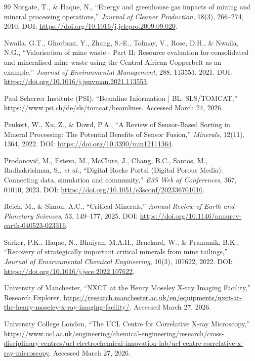 \documentclass[12pt,a4paper]{article}
\begin{document}
\begin{thebibliography}{99}
Norgate, T., \& Haque, N., ``Energy and greenhouse gas impacts of mining and mineral processing operations,'' \textit{Journal of Cleaner Production}, 18(3), 266--274, 2010. DOI: \url{https://doi.org/10.1016/j.jclepro.2009.09.020}.

Nwaila, G.T., Ghorbani, Y., Zhang, S.-E., Tolmay, V., Rose, D.H., \& Nwaila, N.G., ``Valorisation of mine waste - Part II: Resource evaluation for consolidated and mineralised mine waste using the Central African Copperbelt as an example,'' \textit{Journal of Environmental Management}, 288, 113553, 2021. DOI: \url{https://doi.org/10.1016/j.jenvman.2021.113553}.

Paul Scherrer Institute (PSI), ``Beamline Information | BL: SLS/TOMCAT,'' \url{https://www.psi.ch/de/sls/tomcat/beamlines}. Accessed March 24, 2026.

Peukert, W., Xu, Z., \& Dowd, P.A., ``A Review of Sensor-Based Sorting in Mineral Processing: The Potential Benefits of Sensor Fusion,'' \textit{Minerals}, 12(11), 1364, 2022. DOI: \url{https://doi.org/10.3390/min12111364}.

Prodanović, M., Esteva, M., McClure, J., Chang, B.C., Santos, M., Radhakrishnan, S., \textit{et al.}, ``Digital Rocks Portal (Digital Porous Media): Connecting data, simulation and community,'' \textit{E3S Web of Conferences}, 367, 01010, 2023. DOI: \url{https://doi.org/10.1051/e3sconf/202336701010}.

Reich, M., \& Simon, A.C., ``Critical Minerals,'' \textit{Annual Review of Earth and Planetary Sciences}, 53, 149--177, 2025. DOI: \url{https://doi.org/10.1146/annurev-earth-040523-023316}.

Sarker, P.K., Haque, N., Bhuiyan, M.A.H., Bruckard, W., \& Pramanik, B.K., ``Recovery of strategically important critical minerals from mine tailings,'' \textit{Journal of Environmental Chemical Engineering}, 10(3), 107622, 2022. DOI: \url{https://doi.org/10.1016/j.jece.2022.107622}.

University of Manchester, ``NXCT at the Henry Moseley X-ray Imaging Facility,'' Research Explorer, \url{https://research.manchester.ac.uk/en/equipments/nxct-at-the-henry-moseley-x-ray-imaging-facility/}. Accessed March 27, 2026.

University College London, ``The UCL Centre for Correlative X-ray Microscopy,'' \url{https://www.ucl.ac.uk/engineering/chemical-engineering/research/cross-disciplinary-centres/ucl-electrochemical-innovation-lab/ucl-centre-correlative-x-ray-microscopy}. Accessed March 27, 2026.


\end{thebibliography}
\end{document}

